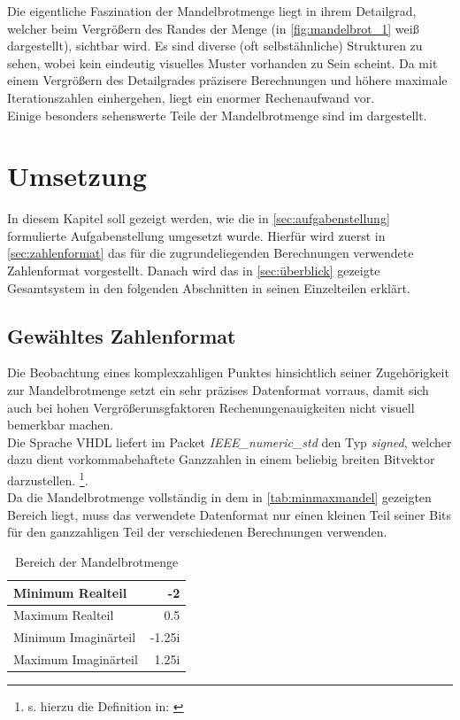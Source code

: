 \documentclass[a4paper,12pt,onesided]{report}
\begin{document}
Die eigentliche Faszination der Mandelbrotmenge liegt in ihrem Detailgrad, welcher beim Vergrößern des Randes der Menge (in \autoref{fig:mandelbrot_1} weiß dargestellt), sichtbar wird. Es sind diverse (oft selbstähnliche) Strukturen zu sehen, wobei kein eindeutig visuelles Muster vorhanden zu Sein scheint. Da mit einem Vergrößern des Detailgrades präzisere Berechnungen und höhere maximale Iterationszahlen einhergehen, liegt ein enormer Rechenaufwand vor.\\
Einige besonders sehenswerte Teile der Mandelbrotmenge sind im %
dargestellt.

\chapter{Umsetzung} %
In diesem Kapitel soll gezeigt werden, wie die in \autoref{sec:aufgabenstellung} formulierte Aufgabenstellung umgesetzt wurde. Hierfür wird zuerst in \autoref{sec:zahlenformat} das für die zugrundeliegenden Berechnungen verwendete Zahlenformat vorgestellt. Danach wird das in \autoref{sec:überblick} gezeigte Gesamtsystem in den folgenden Abschnitten in seinen Einzelteilen erklärt.

\section{Gewähltes Zahlenformat}
\label{sec:zahlenformat}
Die Beobachtung eines komplexzahligen Punktes hinsichtlich seiner Zugehörigkeit zur Mandelbrotmenge setzt ein sehr präzises Datenformat vorraus, damit sich auch bei hohen Vergrößerunsgfaktoren Rechenungenauigkeiten nicht visuell bemerkbar machen.\\
Die Sprache VHDL liefert im Packet \textit{IEEE\_numeric\_std} den Typ \textit{signed}, welcher dazu dient vorkommabehaftete Ganzzahlen in einem beliebig breiten Bitvektor darzustellen. \footnote{s. hierzu die Definition in: \cite{ieeeNumeric}}.\\
Da die Mandelbrotmenge vollständig in dem in \autoref{tab:minmaxmandel} gezeigten Bereich liegt, muss das verwendete Datenformat nur einen kleinen Teil seiner Bits für den ganzzahligen Teil der verschiedenen Berechnungen verwenden. 

\begin{table}[H]
	\centering
	\begin{tabular}{|l|r|}	
		\hline
		Minimum Realteil & -2 \\ \hline
		Maximum Realteil & 0.5 \\ \hline
		Minimum Imaginärteil & -1.25i \\ \hline
		Maximum Imaginärteil & 1.25i \\ \hline
	\end{tabular}
	\caption{Bereich der Mandelbrotmenge}
	\label{tab:minmaxmandel}
\end{table}
\end{document}
